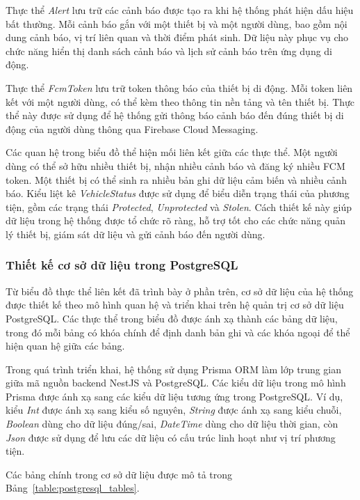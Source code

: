 \documentclass[../DoAn.tex]{subfiles}
\begin{document}
Thực thể \textit{Alert} lưu trữ các cảnh báo được tạo ra khi hệ thống phát hiện dấu hiệu bất thường. Mỗi cảnh báo gắn với một thiết bị và một người dùng, bao gồm nội dung cảnh báo, vị trí liên quan và thời điểm phát sinh. Dữ liệu này phục vụ cho chức năng hiển thị danh sách cảnh báo và lịch sử cảnh báo trên ứng dụng di động.

Thực thể \textit{FcmToken} lưu trữ token thông báo của thiết bị di động. Mỗi token liên kết với một người dùng, có thể kèm theo thông tin nền tảng và tên thiết bị. Thực thể này được sử dụng để hệ thống gửi thông báo cảnh báo đến đúng thiết bị di động của người dùng thông qua Firebase Cloud Messaging.

Các quan hệ trong biểu đồ thể hiện mối liên kết giữa các thực thể. Một người dùng có thể sở hữu nhiều thiết bị, nhận nhiều cảnh báo và đăng ký nhiều FCM token. Một thiết bị có thể sinh ra nhiều bản ghi dữ liệu cảm biến và nhiều cảnh báo. Kiểu liệt kê \textit{VehicleStatus} được sử dụng để biểu diễn trạng thái của phương tiện, gồm các trạng thái \textit{Protected}, \textit{Unprotected} và \textit{Stolen}. Cách thiết kế này giúp dữ liệu trong hệ thống được tổ chức rõ ràng, hỗ trợ tốt cho các chức năng quản lý thiết bị, giám sát dữ liệu và gửi cảnh báo đến người dùng.

\subsubsection{Thiết kế cơ sở dữ liệu trong PostgreSQL}
\label{subsubsection:4.2.3.postgresql_design}

Từ biểu đồ thực thể liên kết đã trình bày ở phần trên, cơ sở dữ liệu của hệ thống được thiết kế theo mô hình quan hệ và triển khai trên hệ quản trị cơ sở dữ liệu PostgreSQL. Các thực thể trong biểu đồ được ánh xạ thành các bảng dữ liệu, trong đó mỗi bảng có khóa chính để định danh bản ghi và các khóa ngoại để thể hiện quan hệ giữa các bảng.

Trong quá trình triển khai, hệ thống sử dụng Prisma ORM làm lớp trung gian giữa mã nguồn backend NestJS và PostgreSQL. Các kiểu dữ liệu trong mô hình Prisma được ánh xạ sang các kiểu dữ liệu tương ứng trong PostgreSQL. Ví dụ, kiểu \textit{Int} được ánh xạ sang kiểu số nguyên, \textit{String} được ánh xạ sang kiểu chuỗi, \textit{Boolean} dùng cho dữ liệu đúng/sai, \textit{DateTime} dùng cho dữ liệu thời gian, còn \textit{Json} được sử dụng để lưu các dữ liệu có cấu trúc linh hoạt như vị trí phương tiện.

Các bảng chính trong cơ sở dữ liệu được mô tả trong Bảng~\ref{table:postgresql_tables}.
\end{document}

